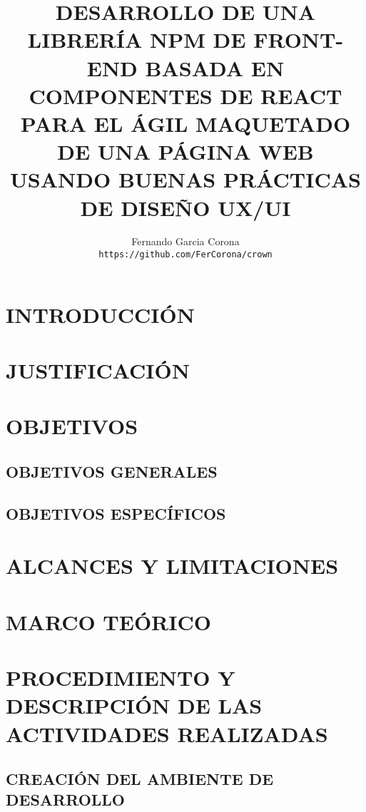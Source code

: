 \documentclass[a4paper,12pt]{report}
\author{
  Fernando Garcia Corona\\
  \texttt{https://github.com/FerCorona/crown}
}
\title{DESARROLLO DE UNA LIBRERÍA NPM DE FRONT-END BASADA EN COMPONENTES DE REACT PARA EL ÁGIL MAQUETADO DE UNA PÁGINA WEB USANDO BUENAS PRÁCTICAS DE DISEÑO UX/UI}
\begin{document}
	\maketitle

	\tableofcontents
	
		\chapter {INTRODUCCIÓN}
			
		\chapter {JUSTIFICACIÓN }
			
		
		\chapter {OBJETIVOS }
			\section {OBJETIVOS GENERALES}
				
			
			\section {OBJETIVOS ESPECÍFICOS} 
				
			
		\chapter {ALCANCES Y LIMITACIONES }
				
		
		\chapter {MARCO TEÓRICO  }
			
		
		\chapter {PROCEDIMIENTO Y DESCRIPCIÓN DE LAS ACTIVIDADES REALIZADAS}
			
			
			\section {CREACIÓN DEL AMBIENTE DE DESARROLLO}
				
				
\end{document}
